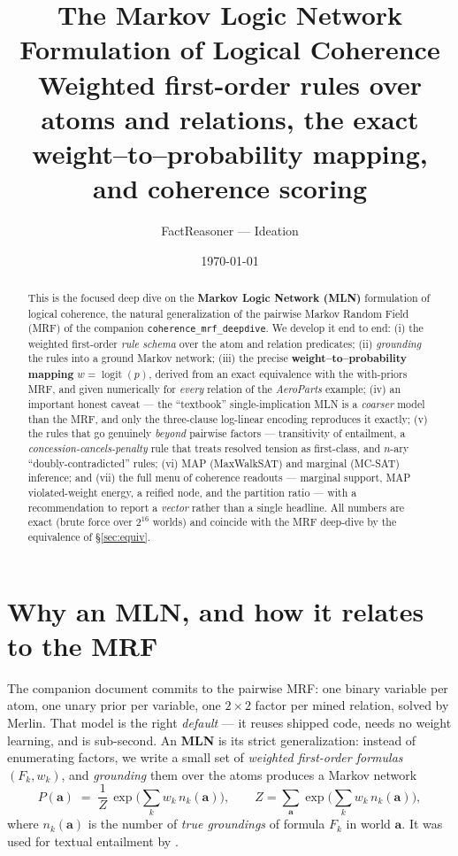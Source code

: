 \documentclass[11pt]{article}
\title{The Markov Logic Network Formulation of Logical Coherence\\
       \large Weighted first-order rules over atoms and relations, the exact
       weight--to--probability mapping, and coherence scoring}
\author{FactReasoner --- Ideation}
\date{\today}
\begin{document}
\maketitle

\begin{abstract}\noindent
This is the focused deep dive on the \textbf{Markov Logic Network (MLN)} formulation of
logical coherence, the natural generalization of the pairwise Markov Random Field (MRF) of
the companion \texttt{coherence\_mrf\_deepdive}. We develop it end to end: (i) the weighted
first-order \emph{rule schema} over the atom and relation predicates; (ii) \emph{grounding}
the rules into a ground Markov network; (iii) the precise \textbf{weight--to--probability
mapping} $w=\operatorname{logit}(p)$, derived from an exact equivalence with the with-priors
MRF, and given numerically for \emph{every} relation of the \emph{AeroParts} example; (iv) an
important honest caveat --- the ``textbook'' single-implication MLN is a \emph{coarser} model
than the MRF, and only the three-clause log-linear encoding reproduces it exactly; (v) the
rules that go genuinely \emph{beyond} pairwise factors --- transitivity of entailment, a
\emph{concession-cancels-penalty} rule that treats resolved tension as first-class, and
$n$-ary ``doubly-contradicted'' rules; (vi) MAP (MaxWalkSAT) and marginal (MC-SAT) inference;
and (vii) the full menu of coherence readouts --- marginal support, MAP violated-weight
energy, a reified node, and the partition ratio --- with a recommendation to report a
\emph{vector} rather than a single headline. All numbers are exact (brute force over $2^{16}$
worlds) and coincide with the MRF deep-dive by the equivalence of \S\ref{sec:equiv}.
\end{abstract}

\tableofcontents

\section{Why an MLN, and how it relates to the MRF}
\label{sec:why}

The companion document commits to the pairwise MRF: one binary variable per atom, one unary
prior per variable, one $2\times2$ factor per mined relation, solved by Merlin. That model is
the right \emph{default} --- it reuses shipped code, needs no weight learning, and is
sub-second. An \textbf{MLN} \citep{mln,mln-cacm} is its strict generalization: instead of
enumerating factors, we write a small set of \emph{weighted first-order formulas}
$(F_k,w_k)$, and \emph{grounding} them over the atoms produces a Markov network
\begin{equation}
  P(\mathbf a)\;=\;\frac1Z\,\exp\!\Big(\sum_k w_k\, n_k(\mathbf a)\Big),
  \qquad
  Z=\sum_{\mathbf a}\exp\!\Big(\sum_k w_k\, n_k(\mathbf a)\Big),
  \label{eq:mln}
\end{equation}
where $n_k(\mathbf a)$ is the number of \emph{true groundings} of formula $F_k$ in world
$\mathbf a$. It was used for textual entailment by \citet{beltagy}.
\end{document}
